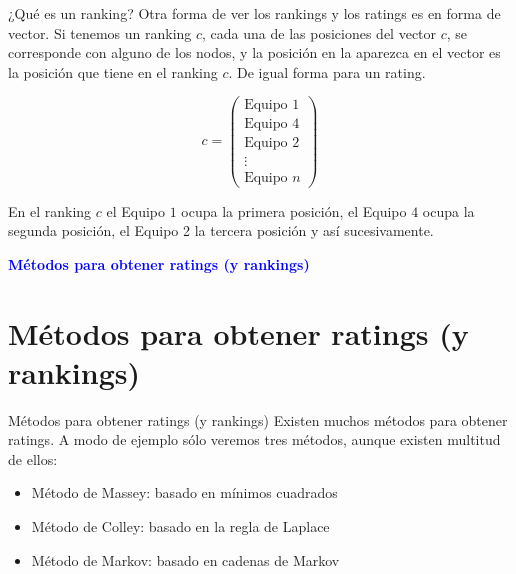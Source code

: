 \documentclass[10pt]{beamer}
\begin{document}
	\begin{frame}{¿Qué es un ranking?}
		Otra forma de ver los rankings y los ratings es en forma de vector. Si tenemos un ranking $c$, cada una de las posiciones del vector $c$, se corresponde con alguno de los nodos, y la posición en la aparezca en el vector es la posición que tiene en el ranking $c$. De igual forma para un rating.
		
		\begin{ejemplo}
			$$ c = \left(
			\begin{array}{c}
			\text{Equipo } 1 \\
			\text{Equipo } 4 \\
			\text{Equipo } 2 \\
			\vdots \\
			\text{Equipo } n
			\end{array}
			\right) $$
				
			En el ranking $c$ el Equipo $1$ ocupa la primera posición, el Equipo $4$ ocupa la segunda posición, el Equipo 2 la tercera posición y así sucesivamente.
			
		\end{ejemplo}
	\end{frame}
	
	\begin{frame}
		\begin{center}
			\Huge\textbf{\textsf{\textcolor{blue}{Métodos para obtener ratings (y rankings)}}}
		\end{center}
	\end{frame}
	
	\section{Métodos para obtener ratings (y rankings)}
	
	\begin{frame}{Métodos para obtener ratings (y rankings)}
		Existen muchos métodos para obtener ratings. A modo de ejemplo sólo veremos tres métodos, aunque existen multitud de ellos:
		
		\begin{itemize}
			\item Método de Massey: basado en mínimos cuadrados
			\item Método de Colley: basado en la regla de Laplace
			\item Método de Markov: basado en cadenas de Markov
		\end{itemize}
	\end{frame}
	
\end{document}
